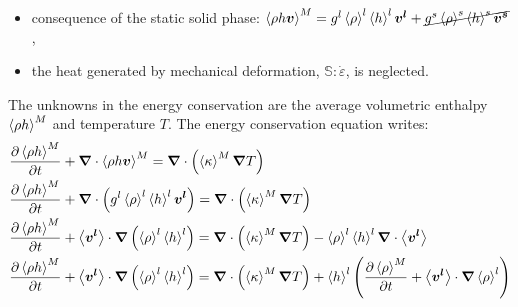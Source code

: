 \begin{itemize}
\itemsep0em
\item consequence of the static solid phase: $\left \langle \rho h \boldsymbol{v} \right \rangle^M = {g^l} \left \langle \rho \right \rangle^l \left \langle h \right \rangle^l \boldsymbol{v^l} +  \cancel{{g^s} \left \langle \rho \right \rangle^s \left \langle h \right \rangle^s \boldsymbol{v^s}}$,
\item the heat generated by mechanical deformation, $\mathbb{S}:\dot{\varepsilon}$, is neglected.
\end{itemize}
The unknowns in the energy conservation are the average volumetric enthalpy $\left \langle \rho h \right \rangle^M$ and temperature $T$.
The energy conservation equation writes:
\begin{subequations}
\begin{align}
	& \tempup{\avg{\rho h}^M} + \nabvec \cdot \avg{\rho h \vec{v}}^M 
	= \nabvec  \cdot \brac{\avg{\kappa}^M \nabvec T } \\
	& \tempup{\avg{\rho h}^M} + \nabvec \cdot \brac{ \gl \rhol \hl \vl} 
	= \nabvec  \cdot \brac{\avg{\kappa}^M \nabvec T } \\
	& \tempup{\avg{\rho h}^M}
		+ \vit \cdot \nabvec \brac{\rhol \hl}
		= \nabvec  \cdot \brac{\avg{\kappa}^M \nabvec T }
		  - \rhol \hl  \nabvec \cdot \vit \\   
	\label{eq:energy_balance_metal}
	& \tempup{\avg{\rho h}^M}
		+ \vit \cdot \nabvec \brac{\rhol \hl}
		= \nabvec  \cdot \brac{\avg{\kappa}^M \nabvec T }
		+ \hl \brac{\tempup{\avg{\rho}^M} + \vit \cdot  \nabvec \rhol} 
\end{align}
\end{subequations}
